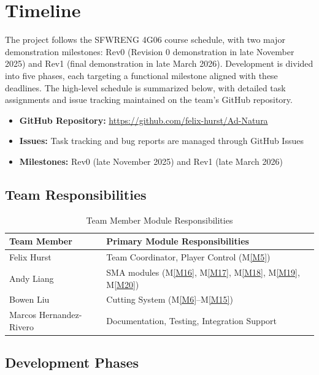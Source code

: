\documentclass[12pt, titlepage]{article}
\newcommand{\mref}[1]{M\ref{#1}}
\begin{document}
\section{Timeline}\label{SecTimeline}

The project follows the SFWRENG 4G06 course schedule, with two major demonstration
milestones: Rev0 (Revision 0 demonstration in late November 2025) and Rev1 (final
demonstration in late March 2026). Development is divided into five phases, each
targeting a functional milestone aligned with these deadlines. The high-level schedule
is summarized below, with detailed task assignments and issue tracking maintained on
the team's GitHub repository.

\begin{itemize}
\item \textbf{GitHub Repository:} \url{https://github.com/felix-hurst/Ad-Natura}
\item \textbf{Issues:} Task tracking and bug reports are managed through GitHub Issues
\item \textbf{Milestones:} Rev0 (late November 2025) and Rev1 (late March 2026)
\end{itemize}

\subsection{Team Responsibilities}
\begin{table}[H]
\centering
\begin{tabular}{|l|l|}
\hline
\textbf{Team Member} & \textbf{Primary Module Responsibilities} \\
\hline
Felix Hurst & Team Coordinator, Player Control (\mref{M5}) \\
\hline
Andy Liang & SMA modules (\mref{M16}, \mref{M17}, \mref{M18}, \mref{M19}, \mref{M20}) \\
\hline
Bowen Liu & Cutting System (\mref{M6}--\mref{M15}) \\
\hline
Marcos Hernandez-Rivero & Documentation, Testing, Integration Support \\
\hline
\end{tabular}
\caption{Team Member Module Responsibilities}
\label{TabTeamResponsibilities}
\end{table}

\subsection{Development Phases}
\end{document}
